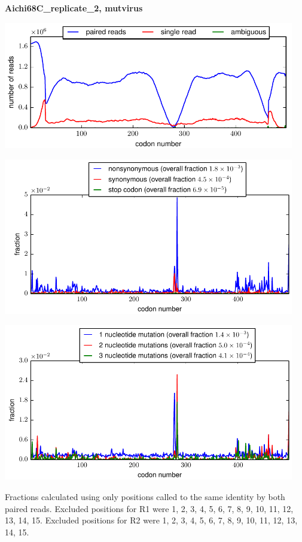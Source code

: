 \documentclass[10pt,letterpaper]{article}
\begin{document}
\centerline{\Large \bf Aichi68C\_replicate\_2, mutvirus}
\vspace{0.1in}

\centerline{\includegraphics[width=5in]{Aichi68C_replicate_2_mutvirus_codondepth.pdf}}
\vspace{0.1in}

\centerline{\includegraphics[width=5in]{Aichi68C_replicate_2_mutvirus_syn-ns-dist.pdf}}
\vspace{0.1in}

\centerline{\includegraphics[width=5in]{Aichi68C_replicate_2_mutvirus_nmutspercodon-dist.pdf}}
\vspace{0.1in}

Fractions calculated using only positions called to the same identity by both paired reads.  Excluded positions for R1 were 1, 2, 3, 4, 5, 6, 7, 8, 9, 10, 11, 12, 13, 14, 15. 
 Excluded positions for R2 were 1, 2, 3, 4, 5, 6, 7, 8, 9, 10, 11, 12, 13, 14, 15. 
\end{document}
